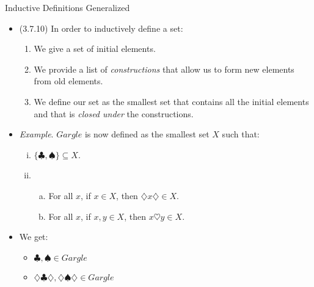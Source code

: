 \documentclass[../slides.tex]{subfiles}
\begin{document}
\begin{frame}{Inductive Definitions Generalized}

	\begin{itemize}
	
		\item (3.7.10) In order to inductively define a set:
		
		\begin{enumerate}[1.]
	
		\item We give a set of initial elements.
		
		\item We provide a list of \emph{constructions} that allow us to form new elements from old elements.
		
		\item We define our set as the smallest set that contains all the initial elements and that is \emph{closed under} the constructions.
	
	\end{enumerate} 
	
		\item \emph{Example}. $Gargle$ is now defined as the smallest set $X$ such that:
			
			\begin{enumerate}[(i)]
			
				\item $\{\clubsuit,\spadesuit\}\subseteq X$.
			
				\item \begin{enumerate}[(a)]
				
					\item For all $x$, if $x\in X$, then $\diamondsuit x\diamondsuit\in X$.
			
					\item For all $x$, if $x,y\in X$, then $ x\heartsuit y\in X$.
				
				\end{enumerate}
				
			\end{enumerate}
			
		\item We get:
		
		\begin{itemize}
				
					\item $\clubsuit,\spadesuit\in Gargle$
					
					\item $\diamondsuit\clubsuit\diamondsuit,\diamondsuit\spadesuit\diamondsuit\in Gargle$
					

\end{itemize}
\end{itemize}
\end{frame}
\end{document}
